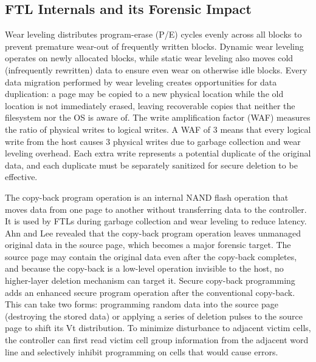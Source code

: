\subsection*{FTL Internals and its Forensic Impact}
Wear leveling distributes program-erase (P/E) cycles evenly across all blocks to prevent premature 
wear-out of frequently written blocks. Dynamic wear leveling operates on newly allocated blocks, 
while static wear leveling also moves cold (infrequently rewritten) data to ensure even wear on 
otherwise idle blocks. Every data migration performed by wear leveling creates opportunities for 
data duplication: a page may be copied to a new physical location while the old location is not 
immediately erased, leaving recoverable copies that neither the filesystem nor the OS is aware of. 
The write amplification factor (WAF) measures the ratio of physical writes to logical writes. A WAF 
of 3 means that every logical write from the host causes 3 physical writes due to garbage 
collection and wear leveling overhead. Each extra write represents a potential duplicate of the 
original data, and each duplicate must be separately sanitized for secure deletion to be effective.
\cite{duplicateschen2022,onarlioglu2018_3}

The copy-back program operation is an internal NAND flash operation that moves data from one page to
another without transferring data to the controller. It is used by FTLs during garbage collection 
and wear leveling to reduce latency. Ahn and Lee revealed that the copy-back program operation 
leaves unmanaged original data in the source page, which becomes a major forensic target. The 
source page may contain the original data even after the copy-back completes, and because the 
copy-back is a low-level operation invisible to the host, no higher-layer deletion mechanism can 
target it. Secure copy-back programming adds an enhanced secure program operation after the 
conventional copy-back. This can take two forms: programming random data into the source page 
(destroying the stored data) or applying a series of deletion pulses to the source page to shift 
its Vt distribution. To minimize disturbance to adjacent victim cells, the controller can first 
read victim cell group information from the adjacent word line and selectively inhibit programming 
on cells that would cause errors. \cite{ahn2021forensics}

